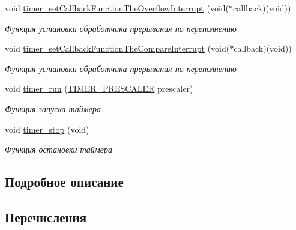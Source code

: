 \begin{DoxyCompactItemize}
void \mbox{\hyperlink{group__timer_counter_ga67dcad411b9845d922ced4c709b2698f}{timer\+\_\+set\+Callback\+Function\+The\+Overflow\+Interrupt}} (void($\ast$callback)(void))
\begin{DoxyCompactList}\small\item\em Функция установки обработчика прерывания по переполнению \end{DoxyCompactList}\item 
void \mbox{\hyperlink{group__timer_counter_ga5df53b7b2c83f7e7c7211cb469c64998}{timer\+\_\+set\+Callback\+Function\+The\+Compare\+Interrupt}} (void($\ast$callback)(void))
\begin{DoxyCompactList}\small\item\em Функция установки обработчика прерывания по переполнению \end{DoxyCompactList}\item 
void \mbox{\hyperlink{group__timer_counter_ga2c3327261a8a0b6726fbd8cf67c59036}{timer\+\_\+run}} (\mbox{\hyperlink{group__timer_counter_ga7e6cbe0bc6f3395283c560bdc0690447}{T\+I\+M\+E\+R\+\_\+\+P\+R\+E\+S\+C\+A\+L\+ER}} prescaler)
\begin{DoxyCompactList}\small\item\em Функция запуска таймера \end{DoxyCompactList}\item 
void \mbox{\hyperlink{group__timer_counter_ga37980fc313f86d7f40a3d7643861ed29}{timer\+\_\+stop}} (void)
\begin{DoxyCompactList}\small\item\em Функция остановки таймера \end{DoxyCompactList}\end{DoxyCompactItemize}


\subsection{Подробное описание}


\subsection{Перечисления}
\mbox{\label{group__timer_counter_ga2e7008f5da185cf8ce62fb0e5f3079ff}} 
